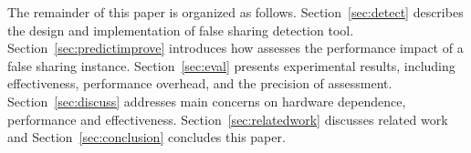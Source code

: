 The remainder of this paper is organized as follows. 
Section~\ref{sec:detect} describes the design and implementation of false sharing detection tool. Section~\ref{sec:predictimprove} introduces how \cheetah{} assesses the performance impact of a false sharing instance. Section~\ref{sec:eval} presents experimental results, including effectiveness, performance overhead, and the precision of assessment. Section~\ref{sec:discuss} addresses main concerns on hardware dependence, performance and effectiveness. Section~\ref{sec:relatedwork} discusses related work and Section~\ref{sec:conclusion} concludes this paper. 



